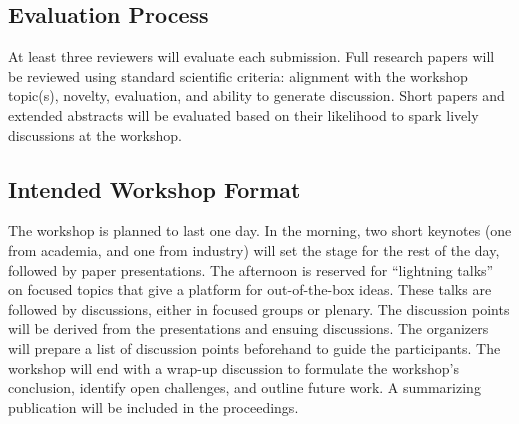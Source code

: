 
\subsection{Evaluation Process}
At least three reviewers will evaluate each submission.
Full research papers will be reviewed using standard scientific criteria: alignment 
with the workshop topic(s), novelty, evaluation, and ability to generate discussion.
Short papers and extended abstracts will be evaluated based on their likelihood 
to spark lively discussions at the workshop.

\subsection{Intended Workshop Format}
The workshop is planned to last one day.
In the morning, two short keynotes (one from academia, and one from industry) 
will set the stage for the rest of the day, followed by paper presentations.
The afternoon is reserved for ``lightning talks'' on focused topics that give a 
platform for out-of-the-box ideas.
These talks are followed by discussions, either in focused groups or plenary.
The discussion points will be derived from the presentations and ensuing discussions.
The organizers will prepare a list of discussion points beforehand to guide the 
participants. %
The workshop will end with a wrap-up discussion to formulate the workshop's 
conclusion, identify open challenges, and outline future work.
A summarizing publication will be included in the proceedings.

